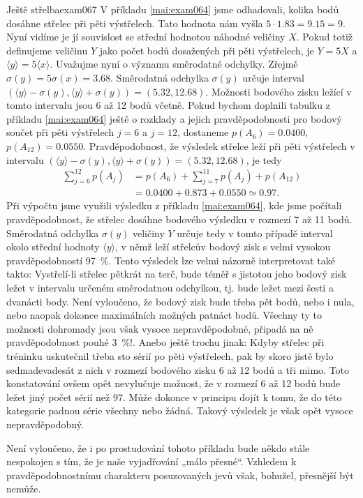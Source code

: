 \begin{mathexam}{Ještě střelba}{exam067}
  V příkladu \ref{mai:exam064} jsme odhadovali, kolika bodů dosáhne střelec při pěti výstřelech.
  Tato hodnota nám vyšla \(\num{5}\cdot\num{1.83} = \num{9.15} = 9\). Nyní vidíme je jí souvislost
  se střední hodnotou náhodné veličiny \(X\). Pokud totiž definujeme veličinu \(Y\) jako počet bodů
  dosažených při pěti výstřelech, je \(Y = 5X\) a \(\langle y \rangle = 5\langle x \rangle\).
  Uvažujme nyní o významu směrodatné odchylky. Zřejmě \(\sigma(y) = 5\sigma(x) = \num{3.68}\).
  Směrodatná odchylka \(\sigma(y)\) určuje interval \((\langle y \rangle - \sigma(y), \langle y
  \rangle + \sigma(y)) = (\num{5.32}, \num{12.68})\). Možnosti bodového zisku ležící v tomto
  intervalu jsou \num{6} až \num{12} bodů včetně. Pokud bychom doplnili tabulku z příkladu
  \ref{mai:exam064} ještě o rozklady a jejich pravděpodobnosti pro bodový součet při pěti výstřelech
  \(j = \num{6}\) a \(j = \num{12}\), dostaneme \(p(A_6) = \num{0.0400}\), \(p(A_{12}) =
  \num{0.0550}\). Pravděpodobnost, že výsledek střelce leží při pěti výstřelech v intervalu
  \((\langle y \rangle - \sigma(y), \langle y \rangle + \sigma(y)) = (\num{5.32}, \num{12.68})\), je
  tedy
  \begin{align*}
    \sum_{j=6}^{12}p(A_j) &= p(A_6) + \sum_{j=7}^{11}p(A_j) + p(A_{12})                \\
                          &= \num{0.0400} + \num{0.873} + \num{0.0550} \simeq \num{0.97}.
  \end{align*}
  Při výpočtu jsme využili výsledku z příkladu \ref{mai:exam064}, kde jsme počítali pravděpodobnost,
  že střelec dosáhne bodového výsledku v rozmezí \num{7} až \num{11} bodů. Směrodatná odchylka
  \(\sigma(y)\) veličiny \(Y\) určuje tedy v tomto případě interval okolo střední hodnoty \(\langle
  y \rangle\), v němž leží střelcův bodový zisk s velmi vysokou pravděpodobností \SI{97}{\percent}.
  Tento výsledek lze velmi názorně interpretovat také takto: Vystřelí-li střelec pětkrát na terč,
  bude téměř s jistotou jeho bodový zisk ležet v intervalu určeném směrodatnou odchylkou, tj. bude
  ležet mezi šesti a dvanácti body. Není vyloučeno, že bodový zisk bude třeba pět bodů, nebo i nula,
  nebo naopak dokonce maximálních možných patnáct bodů. Všechny ty to možnosti dohromady jsou však
  vysoce nepravděpodobné, připadá na ně pravděpodobnost pouhé \SI{3}{\percent}!. Anebo ještě trochu
  jinak: Kdyby střelec při tréninku uskutečnil třeba sto sérií po pěti výstřelech, pak by skoro
  jistě bylo sedmadevadesát z nich v rozmezí bodového zisku \num{6} až \num{12} bodů a tři mimo.
  Toto konstatování ovšem opět nevylučuje možnost, že v rozmezí \num{6} až \num{12} bodů bude ležet
  jiný počet sérií než \num{97}. Může dokonce v principu dojít k tomu, že do této kategorie padnou
  série všechny nebo žádná. Takový výsledek je však opět vysoce nepravděpodobný.
  
  Není vyloučeno, že i po prostudování tohoto příkladu bude někdo stále nespokojen s tím, že je naše
  vyjadřování „málo přesné“. Vzhledem k pravděpodobnostnímu charakteru posuzovaných jevů však,
  bohužel, přesnější být nemůže.
\end{mathexam}